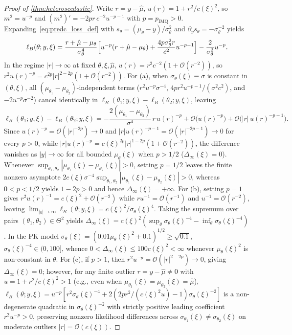 \documentclass[11pt,a4paper,reqno]{amsart}
\theoremstyle{definition}
\theoremstyle{remark}
\begin{document}
\begin{proof}[Proof of \cref{thm:heteroscedastic}]
Write $r = y - \hat{\mu}$, $u(r) = 1 + r^2/c(\xi)^2$, so $m^2 = u^{-p}$ and $(m^2)' = -2p r\,c^{-2} u^{-p-1}$ with $p = p_{\mathrm{IMQ}} > 0$. Expanding~\eqref{eq:predc_loss_def} with $s_\theta = (\mu_\theta - y)/\sigma_\theta^2$ and $\partial_y s_\theta = -\sigma_\theta^{-2}$ yields
\[
\ell_B(\theta; y, \xi)
= \frac{r + \hat{\mu} - \mu_\theta}{\sigma_\theta^4}\Bigl[u^{-p}(r + \hat{\mu} - \mu_\theta) + \frac{4p\sigma_\theta^2 r}{c^2}u^{-p-1}\Bigr] - \frac{2}{\sigma_\theta^2}u^{-p}.
\]
In the regime $|r| \to \infty$ at fixed $\theta, \xi, \hat{\mu}$, $u(r) = r^2 c^{-2}(1 + \mathcal{O}(r^{-2}))$, so $r^2 u(r)^{-p} = c^{2p} |r|^{2-2p}(1 + \mathcal{O}(r^{-2}))$.
For (a), when $\sigma_\theta(\xi) \equiv \sigma$ is constant in $(\theta, \xi)$, all $(\mu_{\theta_1}-\mu_{\theta_2})$-independent terms ($r^2 u^{-p}\sigma^{-4}$, $4p r^2 u^{-p-1}/(\sigma^2 c^2)$, and $-2 u^{-p}\sigma^{-2}$) cancel identically in $\ell_B(\theta_1; y, \xi) - \ell_B(\theta_2; y, \xi)$, leaving
\[
\ell_B(\theta_1; y, \xi) - \ell_B(\theta_2; y, \xi)
= -\frac{2(\mu_{\theta_1} - \mu_{\theta_2})}{\sigma^4}\,r\,u(r)^{-p} + \mathcal{O}\bigl(u(r)^{-p}\bigr) + \mathcal{O}\bigl(|r|\,u(r)^{-p-1}\bigr).
\]
Since $u(r)^{-p} = \mathcal{O}(|r|^{-2p}) \to 0$ and $|r|u(r)^{-p-1} = \mathcal{O}(|r|^{-2p-1}) \to 0$ for every $p > 0$, while $|r|u(r)^{-p} = c(\xi)^{2p}|r|^{1-2p}(1 + \mathcal{O}(r^{-2}))$, the difference vanishes as $|y| \to \infty$ for all bounded $\mu_\theta(\xi)$ when $p > 1/2$ ($\Delta_\infty(\xi) = 0$). Whenever $\sup_{\theta_1,\theta_2}|\mu_{\theta_1}(\xi) - \mu_{\theta_2}(\xi)| > 0$, setting $p = 1/2$ leaves the finite nonzero asymptote $2c(\xi)\sigma^{-4}\sup_{\theta_1,\theta_2}|\mu_{\theta_1}(\xi) - \mu_{\theta_2}(\xi)| > 0$, whereas $0 < p < 1/2$ yields $1 - 2p > 0$ and hence $\Delta_\infty(\xi) = +\infty$.
For (b), setting $p = 1$ gives $r^2 u(r)^{-1} = c(\xi)^2 + \mathcal{O}(r^{-2})$ while $r u^{-1} = \mathcal{O}(r^{-1})$ and $u^{-1} = \mathcal{O}(r^{-2})$, leaving $\lim_{|y|\to\infty} \ell_B(\theta; y, \xi) = c(\xi)^2/\sigma_\theta(\xi)^4$. Taking the supremum over pairs $(\theta_1, \theta_2) \in \Theta^2$ yields $\Delta_\infty(\xi) = c(\xi)^2 (\sup_\theta \sigma_\theta(\xi)^{-4} - \inf_\theta \sigma_\theta(\xi)^{-4})$. In the PK model $\sigma_\theta(\xi) = (0.01\mu_\theta(\xi)^2 + 0.1)^{1/2} \ge \sqrt{0.1}$, $\sigma_\theta(\xi)^{-4} \in (0, 100]$, whence $0 < \Delta_\infty(\xi) \le 100 c(\xi)^2 < \infty$ whenever $\mu_\theta(\xi)^2$ is non-constant in $\theta$.
For (c), if $p > 1$, then $r^2 u^{-p} = \mathcal{O}(|r|^{2-2p}) \to 0$, giving $\Delta_\infty(\xi) = 0$; however, for any finite outlier $r = y - \hat{\mu} \neq 0$ with $u = 1 + r^2/c(\xi)^2 > 1$ (e.g., even when $\mu_{\theta_1}(\xi) = \mu_{\theta_2}(\xi) = \hat{\mu}$), $\ell_B(\theta; y, \xi) = u^{-p}[r^2 \sigma_\theta(\xi)^{-4} + 2(2pr^2/(c(\xi)^2 u) - 1)\sigma_\theta(\xi)^{-2}]$ is a non-degenerate quadratic in $\sigma_\theta(\xi)^{-2}$ with strictly positive leading coefficient $r^2 u^{-p} > 0$, preserving nonzero likelihood differences across $\sigma_{\theta_1}(\xi) \neq \sigma_{\theta_2}(\xi)$ on moderate outliers $|r| = \mathcal{O}(c(\xi))$.
\end{proof}
\end{document}
